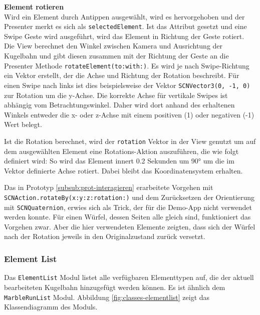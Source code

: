 \textbf{Element rotieren} \\
Wird ein Element durch Antippen ausgewählt, wird es hervorgehoben und der Presenter merkt es sich als \texttt{selectedElement}.
Ist das Attribut gesetzt und eine Swipe Geste wird ausgeführt, wird das Element in Richtung der Geste rotiert.
Die View berechnet den Winkel zwischen Kamera und Ausrichtung der Kugelbahn und gibt diesen zusammen mit der Richtung der Geste an die Presenter Methode \texttt{rotateElement(to:with:)}.
Es wird je nach Swipe-Richtung ein Vektor erstellt, der die Achse und Richtung der Rotation beschreibt.
Für einen Swipe nach links ist dies beispielsweise der Vektor \texttt{SCNVector3(0, -1, 0)} zur Rotation um die y-Achse.
Die korrekte Achse für vertikale Swipes ist abhängig vom Betrachtungswinkel.
Daher wird dort anhand des erhaltenen Winkels entweder die x- oder z-Achse mit einem positiven (1) oder negativen (-1) Wert belegt.

Ist die Rotation berechnet, wird der \texttt{rotation} Vektor in der View genutzt um auf dem ausgewählten Element eine Rotations-Aktion auszuführen, die wie folgt definiert wird:
So wird das Element innert 0.2 Sekunden um 90° um die im Vektor definierte Achse rotiert.
Dabei bleibt das Koordinatensystem erhalten.

Das in Prototyp \ref{subsub:prot-interagieren} erarbeitete Vorgehen mit \texttt{SCNAction.rotateBy(x:y:z:rotation:)} und dem Zurücksetzen der Orientierung mit \texttt{SCNQuaternion}, erwies sich als Trick, der für die Demo-App nicht verwendet werden konnte.
Für einen Würfel, dessen Seiten alle gleich sind, funktioniert das Vorgehen zwar.
Aber die hier verwendeten Elemente zeigten, dass sich der Würfel nach der Rotation jeweils in den Originalzustand zurück versetzt. 

\subsubsection{Element List}

Das \texttt{ElementList} Modul listet alle verfügbaren Elementtypen auf, die der aktuell bearbeiteten Kugelbahn hinzugefügt werden können.
Es ist ähnlich dem \texttt{MarbleRunList} Modul.
Abbildung \ref{fig:classes-elementlist} zeigt das Klassendiagramm des Moduls.


